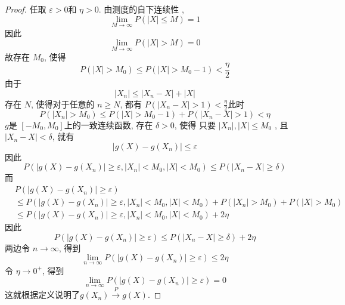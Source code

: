 \documentclass[../main.tex]{subfiles}
\begin{document}
\begin{proof}
     任取 \(   \varepsilon > 0  \)和 \(  \eta > 0  \). 由测度的自下连续性 , \[
     \lim_{M\to \infty}P\left( \left| X \right|\le  M  \right)= 1 
     \]  因此 \[
     \lim_{M\to \infty}P\left( \left| X \right|>  M  \right)= 0 
     \]故存在 \(  M_0  \), 使得 \[
   P\left( \left| X \right|> M_0  \right)\le    P\left( \left| X \right|>   M_0-1  \right)< \frac{\eta  }{2 }  
     \] 由于 \[
     \left| X_{n} \right|\le \left| X_{n}-X \right|+ \left| X \right|   
     \]存在 \(  N  \), 使得对于任意的 \(  n\ge N  \), 都有 \(  P\left( \left| X_{n}-X \right|> 1  \right)   < \frac{\eta  }{2 } \)此时  \[
     P\left( \left| X_{n} \right|> M_0  \right)\le P\left( \left| X \right|> M_0 -1 \right)+ P\left( \left| X_{n}-X \right|>  1   \right)   < \eta 
     \]   \(  g  \)是 \(  [-M_0,M_0]  \)上的一致连续函数, 存在 \(   \delta > 0  \), 使得 只要 \(  \left| X_{n} \right|, \left| X \right|\le M_0    \) , 且\(  \left| X_{n}-X \right|<  \delta    \), 就有 \[
     \left| g\left( X \right)-g\left( X_n \right)   \right|\le  \varepsilon  
     \]   因此 \[
     P\left( \left| g\left( X \right)-g\left( X_n \right)   \right|\ge  \varepsilon  ,\left| X_{n} \right|< M_0, \left| X \right|< M_0   \right)\le P\left( \left| X_{n}-X \right|\ge   \delta  \right)  
     \]而 \[
   \begin{aligned}
     &P\left( \left| g\left( X \right)-g\left( X_{n} \right)   \right|\ge  \varepsilon   \right)\\ 
      &\le P\left( \left| g\left( X \right)-g\left( X_{n} \right)   \right|\ge  \varepsilon , \left| X_{n} \right|< M_0, \left| X \right|< M_0    \right)  + P\left( \left| X_{n} \right|> M_0  \right)+ P\left( \left| X \right|> M_0  \right)   \\ 
       &\le P\left( \left| g\left( X \right)-g\left( X_{n} \right)   \right|\ge  \varepsilon , \left| X_{n} \right|< M_0, \left| X \right|< M_0    \right)+ 2\eta  
   \end{aligned}
     \]因此 \[
     P\left( \left| g\left( X \right)-g\left( X_{n} \right)   \right|\ge   \varepsilon   \right)\le  P\left( \left| X_{n}-X \right|\ge    \delta   \right)+2 \eta   
     \]两边令 \(  n\to \infty  \), 得到 \[
     \lim_{n\to \infty}P\left( \left| g\left( X \right)-g\left( X_{n} \right)   \right|\ge  \varepsilon   \right)\le 2 \eta  
     \] 令 \(  \eta \to 0^{+ }  \), 得到 \[
     \lim_{n\to \infty}P\left( \left| g\left( X \right)-g\left( X_{n} \right)   \right|\ge  \varepsilon   \right)= 0 
     \] 这就根据定义说明了$g(X_n) \xrightarrow{P} g(X)$.
\end{proof}
\end{document}
